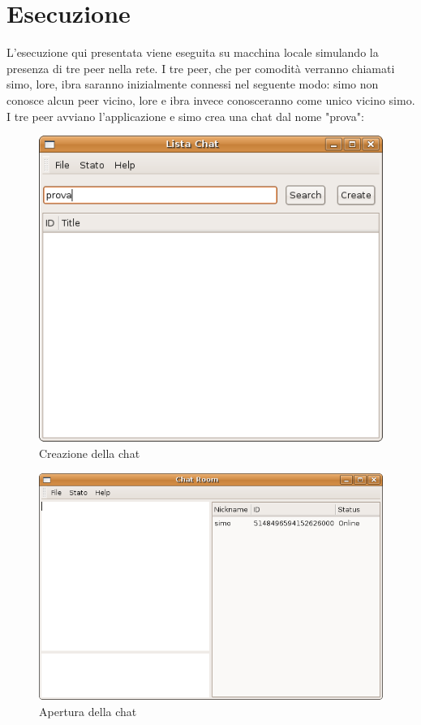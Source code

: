 \section{Esecuzione}
L'esecuzione qui presentata viene eseguita su macchina locale simulando la presenza di tre peer nella rete. I tre peer, che per comodità verranno chiamati simo, lore, ibra saranno inizialmente connessi nel seguente modo: simo non conosce alcun peer vicino, lore e ibra invece conosceranno come unico vicino simo. I tre peer avviano l'applicazione e simo crea una chat dal nome "prova":
\begin{figure}[H]
\begin{center}
\includegraphics[scale=0.5]{etc/crea_chat.png}
\caption{Creazione della chat}
\label{creachat}
\end{center}
\end{figure}
\begin{figure}[H]
\begin{center}
\includegraphics[scale=0.5]{etc/apertura_chat.png}
\caption{Apertura della chat}
\label{aperturachat}
\end{center}
\end{figure}

